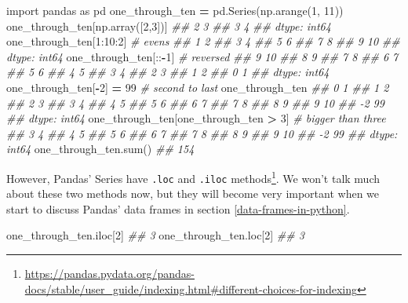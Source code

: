 \documentclass[12pt,krantz2]{krantz}
\makeatletter
\newenvironment{Shaded}{\begin{snugshade}}{\end{snugshade}}
\newcommand{\BuiltInTok}[1]{#1}
\newcommand{\CommentTok}[1]{\textcolor[rgb]{0.37,0.37,0.37}{\textit{#1}}}
\newcommand{\DecValTok}[1]{\textcolor[rgb]{0.06,0.06,0.06}{#1}}
\newcommand{\ImportTok}[1]{#1}
\newcommand{\NormalTok}[1]{#1}
\newcommand{\OperatorTok}[1]{\textcolor[rgb]{0.43,0.43,0.43}{\textbf{#1}}}
\renewcommand{\href}[2]{#2\footnote{\url{#1}}}
\newenvironment{kframe}{%
\medskip{}
\setlength{\fboxsep}{.8em}
 \def\at@end@of@kframe{}%
 \ifinner\ifhmode%
  \def\at@end@of@kframe{\end{minipage}}%
  \begin{minipage}{\columnwidth}%
 \fi\fi%
 \def\FrameCommand##1{\hskip\@totalleftmargin \hskip-\fboxsep
 \colorbox{shadecolor}{##1}\hskip-\fboxsep
     \hskip-\linewidth \hskip-\@totalleftmargin \hskip\columnwidth}%
 \MakeFramed {\advance\hsize-\width
   \@totalleftmargin\z@ \linewidth\hsize
   \@setminipage}}%
 {\par\unskip\endMakeFramed%
 \at@end@of@kframe}
\renewenvironment{Shaded}{\begin{kframe}}{\end{kframe}}
\makeatother
\begin{document}
\begin{Shaded}
\begin{Highlighting}[]
\ImportTok{import}\NormalTok{ pandas }\ImportTok{as}\NormalTok{ pd}
\NormalTok{one_through_ten }\OperatorTok{=}\NormalTok{ pd.Series(np.arange(}\DecValTok{1}\NormalTok{, }\DecValTok{11}\NormalTok{))}
\NormalTok{one_through_ten[np.array([}\DecValTok{2}\NormalTok{,}\DecValTok{3}\NormalTok{])]}
\CommentTok{## 2    3}
\CommentTok{## 3    4}
\CommentTok{## dtype: int64}
\NormalTok{one_through_ten[}\DecValTok{1}\NormalTok{:}\DecValTok{10}\NormalTok{:}\DecValTok{2}\NormalTok{] }\CommentTok{# evens}
\CommentTok{## 1     2}
\CommentTok{## 3     4}
\CommentTok{## 5     6}
\CommentTok{## 7     8}
\CommentTok{## 9    10}
\CommentTok{## dtype: int64}
\NormalTok{one_through_ten[::}\OperatorTok{-}\DecValTok{1}\NormalTok{] }\CommentTok{# reversed}
\CommentTok{## 9    10}
\CommentTok{## 8     9}
\CommentTok{## 7     8}
\CommentTok{## 6     7}
\CommentTok{## 5     6}
\CommentTok{## 4     5}
\CommentTok{## 3     4}
\CommentTok{## 2     3}
\CommentTok{## 1     2}
\CommentTok{## 0     1}
\CommentTok{## dtype: int64}
\NormalTok{one_through_ten[}\OperatorTok{-}\DecValTok{2}\NormalTok{] }\OperatorTok{=} \DecValTok{99} \CommentTok{# second to last}
\NormalTok{one_through_ten}
\CommentTok{##  0     1}
\CommentTok{##  1     2}
\CommentTok{##  2     3}
\CommentTok{##  3     4}
\CommentTok{##  4     5}
\CommentTok{##  5     6}
\CommentTok{##  6     7}
\CommentTok{##  7     8}
\CommentTok{##  8     9}
\CommentTok{##  9    10}
\CommentTok{## -2    99}
\CommentTok{## dtype: int64}
\NormalTok{one_through_ten[one_through_ten }\OperatorTok{>} \DecValTok{3}\NormalTok{] }\CommentTok{# bigger than three}
\CommentTok{##  3     4}
\CommentTok{##  4     5}
\CommentTok{##  5     6}
\CommentTok{##  6     7}
\CommentTok{##  7     8}
\CommentTok{##  8     9}
\CommentTok{##  9    10}
\CommentTok{## -2    99}
\CommentTok{## dtype: int64}
\NormalTok{one_through_ten.}\BuiltInTok{sum}\NormalTok{()}
\CommentTok{## 154}
\end{Highlighting}
\end{Shaded}

However, \href{https://pandas.pydata.org/pandas-docs/stable/user_guide/indexing.html\#different-choices-for-indexing}{Pandas' Series have \texttt{.loc} and \texttt{.iloc} methods}. We won't talk much about these two methods now, but they will become very important when we start to discuss Pandas' data frames in section \ref{data-frames-in-python}.

\begin{Shaded}
\begin{Highlighting}[]
\NormalTok{one_through_ten.iloc[}\DecValTok{2}\NormalTok{]}
\CommentTok{## 3}
\NormalTok{one_through_ten.loc[}\DecValTok{2}\NormalTok{]}
\CommentTok{## 3}
\end{Highlighting}
\end{Shaded}
\end{document}
